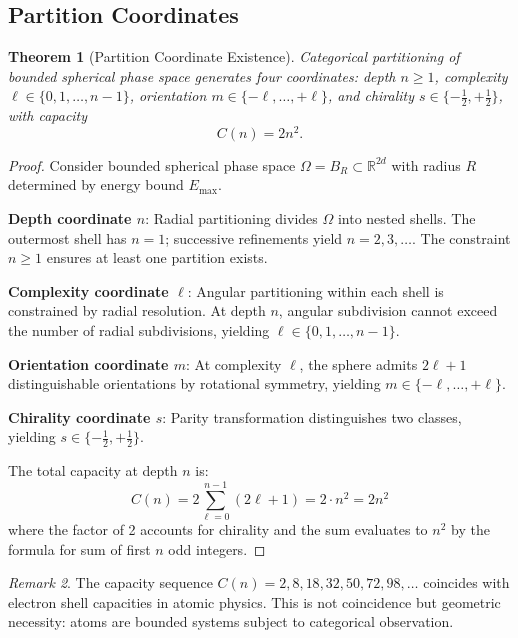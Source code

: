 \documentclass[10pt,twocolumn]{article}
\theoremstyle{plain}
\newtheorem{theorem}{Theorem}[section]
\theoremstyle{definition}
\theoremstyle{remark}
\newtheorem{remark}[theorem]{Remark}
\newcommand{\R}{\mathbb{R}}
\begin{document}
\subsection{Partition Coordinates}

\begin{theorem}[Partition Coordinate Existence]
\label{thm:partition_coords}
Categorical partitioning of bounded spherical phase space generates four coordinates: depth $n \geq 1$, complexity $\ell \in \{0, 1, \ldots, n-1\}$, orientation $m \in \{-\ell, \ldots, +\ell\}$, and chirality $s \in \{-\frac{1}{2}, +\frac{1}{2}\}$, with capacity
\begin{equation}
C(n) = 2n^2.
\label{eq:capacity}
\end{equation}
\end{theorem}

\begin{proof}
Consider bounded spherical phase space $\Omega = B_R \subset \R^{2d}$ with radius $R$ determined by energy bound $E_{\max}$.

\textbf{Depth coordinate $n$}: Radial partitioning divides $\Omega$ into nested shells. The outermost shell has $n = 1$; successive refinements yield $n = 2, 3, \ldots$. The constraint $n \geq 1$ ensures at least one partition exists.

\textbf{Complexity coordinate $\ell$}: Angular partitioning within each shell is constrained by radial resolution. At depth $n$, angular subdivision cannot exceed the number of radial subdivisions, yielding $\ell \in \{0, 1, \ldots, n-1\}$.

\textbf{Orientation coordinate $m$}: At complexity $\ell$, the sphere admits $2\ell + 1$ distinguishable orientations by rotational symmetry, yielding $m \in \{-\ell, \ldots, +\ell\}$.

\textbf{Chirality coordinate $s$}: Parity transformation distinguishes two classes, yielding $s \in \{-\frac{1}{2}, +\frac{1}{2}\}$.

The total capacity at depth $n$ is:
\begin{equation}
C(n) = 2 \sum_{\ell=0}^{n-1} (2\ell + 1) = 2 \cdot n^2 = 2n^2
\end{equation}
where the factor of 2 accounts for chirality and the sum evaluates to $n^2$ by the formula for sum of first $n$ odd integers.
\end{proof}

\begin{remark}
The capacity sequence $C(n) = 2, 8, 18, 32, 50, 72, 98, \ldots$ coincides with electron shell capacities in atomic physics. This is not coincidence but geometric necessity: atoms are bounded systems subject to categorical observation.
\end{remark}
\end{document}
